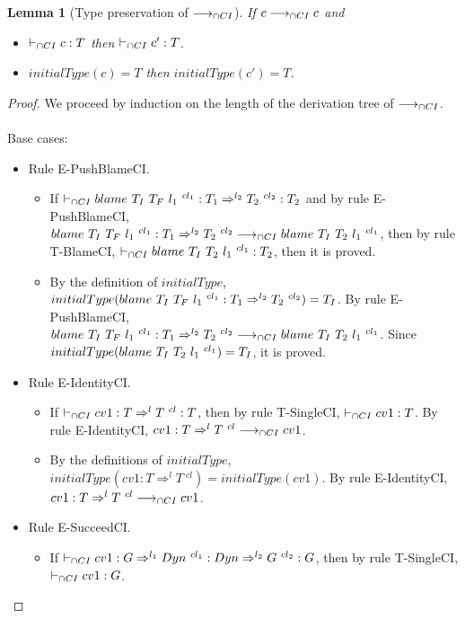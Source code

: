 \documentclass[a4paper]{article}
\newtheorem{lemma}{Lemma}[section]
\begin{document}
\begin{lemma}[Type preservation of $\longrightarrow_{\cap CI}$]
\label{type_preservationCI}
If $c \longrightarrow_{\cap CI} c$ and
\begin{itemize}
    \item $\vdash_{\cap CI} c : T$ then $\vdash_{\cap CI} c' : T$.
    \item $initialType(c) = T$ then $initialType(c') = T$.
\end{itemize}
\end{lemma}
\begin{proof}
We proceed by induction on the length of the derivation tree of $\longrightarrow_{\cap CI}$.\\\\
Base cases:
\begin{itemize}
    \item Rule E-PushBlameCI.
    \begin{itemize}
        \item If $\vdash_{\cap CI} blame\ T_I\ T_F\ l_1\ ^{cl_1} : T_1 \Rightarrow^{l_2} T_2\ ^{cl_2} : T_2$ and by rule E-PushBlameCI, $blame\ T_I\ T_F\ l_1\ ^{cl_1} : T_1 \Rightarrow^{l_2} T_2\ ^{cl_2} \longrightarrow_{\cap CI} blame\ T_I\ T_2\ l_1\ ^{cl_1}$, then by rule T-BlameCI, $\vdash_{\cap CI} blame\ T_I\ T_2\ l_1\ ^{cl_1} : T_2$, then it is proved.
        \item By the definition of $initialType$, $initialType(blame\ T_I\ T_F\ l_1\ ^{cl_1} : T_1 \Rightarrow^{l_2} T_2\ ^{cl_2}) = T_I$.
        By rule E-PushBlameCI, $blame\ T_I\ T_F\ l_1\ ^{cl_1} : T_1 \Rightarrow^{l_2} T_2\ ^{cl_2} \longrightarrow_{\cap CI} blame\ T_I\ T_2\ l_1\ ^{cl_1}$.
        Since $initialType(blame\ T_I\ T_2\ l_1\ ^{cl_1}) = T_I$, it is proved.
    \end{itemize}
    \item Rule E-IdentityCI.
    \begin{itemize}
        \item If $\cits cv1 : T \Rightarrow^l T\ ^{cl} : T$, then by rule T-SingleCI, $\vdash_{\cap CI} cv1 : T$.
        By rule E-IdentityCI, $cv1 : T \Rightarrow^l T\ ^{cl} \longrightarrow_{\cap CI} cv1$.
        \item By the definitions of $initialType$, $initialType(cv1 : T \Rightarrow^l T\ ^{cl}) = initialType(cv1)$.
        By rule E-IdentityCI, $cv1 : T \Rightarrow^l T\ ^{cl} \longrightarrow_{\cap CI} cv1$.
    \end{itemize}
    \item Rule E-SucceedCI.
    \begin{itemize}
        \item If $\vdash_{\cap CI} cv1 : G \Rightarrow^{l_1} Dyn\ ^{cl_1} : Dyn \Rightarrow^{l_2} G\ ^{cl_2} : G$, then by rule T-SingleCI, $\vdash_{\cap CI} cv1 : G$.

\end{itemize}
\end{itemize}
\end{proof}
\end{document}
